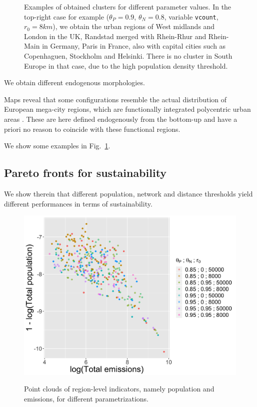 \documentclass{jimis-en}
\begin{document}
\begin{figure}[ht]
  \caption{Examples of obtained clusters for different parameter values. In the top-right case for example ($\theta_P = 0.9$, $\theta_N = 0.8$, variable \texttt{vcount},$r_0 = 8km$), we obtain the urban regions of West midlands and London in the UK, Randstad merged with Rhein-Rhur and Rhein-Main in Germany, Paris in France, also with capital cities such as Copenhaguen, Stockholm and Helsinki. There is no cluster in South Europe in that case, due to the high population density threshold.\label{fig:exclusters}}
\end{figure}

We obtain different endogenous morphologies.

Maps reveal that some configurations resemble the actual distribution of European mega-city regions, which are functionally integrated polycentric urban areas \citep{hall2006polycentric}. These are here defined endogenously from the bottom-up and have a priori no reason to coincide with these functional regions.

We show some examples in Fig.~\ref{fig:exclusters}.






\subsection{Pareto fronts for sustainability}


We show therein that different population, network and distance thresholds yield different performances in terms of sustainability.



\begin{figure}[ht] 
  {\includegraphics[width=\linewidth]{figures/full_effective_pareto.png}}
  \centering
  \label{fig:paretos}
  \caption{Point clouds of region-level indicators, namely population and emissions, for different parametrizations.}
\end{figure}
\end{document}
